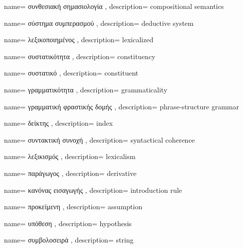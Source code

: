 {name={
συνθεσιακή σημασιολογία
},
description={
compositional semantics
}}

{name={
σύστημα συμπερασμού
},
description={
deductive system
}}

{name={
λεξικοποιημένος
},
description={
lexicalized
}}

{name={
συστατικότητα
},
description={
constituency
}}



{name={
συστατικό
},
description={
constituent
}}

{name={
γραμματικότητα
},
description={
grammaticality
}}

{name={
γραμματική φραστικής δομής
},
description={
phrase-structure grammar
}}

{name={
δείκτης
},
description={
index
}}

{name={
συντακτική συνοχή
},
description={
syntactical coherence
}}

{name={
λεξικισμός
},
description={
lexicalism
}}

{name={
παράγωγος
},
description={
derivative
}}

{name={
κανόνας εισαγωγής
},
description={
introduction rule
}}

{name={
προκείμενη
},
description={
assumption
}}

{name={
υπόθεση
},
description={
hypothesis
}}

{name={
συμβολοσειρά
},
description={
string
}}



